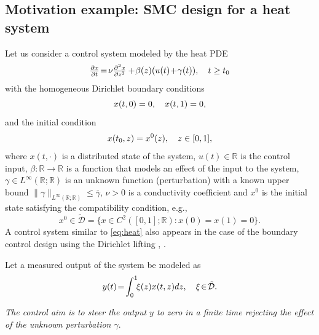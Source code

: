 \documentclass{article}
\newcommand{\R}{\mathbb{R}}
\begin{document}
\subsection{Motivation example: SMC design for a heat system}\label{sec:I.B}
Let us consider a control system modeled by the heat PDE\vspace{-1mm}
\begin{equation}\label{eq:heat}
	\tfrac{\partial x}{\partial t}\!=\!\nu \tfrac{\partial^2x}{\partial z^2}+
	\!\beta(z)(u(t)\!+\!\gamma(t)), \quad t\geq t_0\vspace{-1mm}
\end{equation}
with the homogeneous Dirichlet boundary conditions\vspace{-1mm}
\begin{equation}\label{eq:heat_boundary}
	x(t,0)=0, \quad x(t,1)=0, \vspace{-1mm}
\end{equation}
and the initial condition\vspace{-1mm}
\begin{equation}\label{eq:heat_ic}
	x(t_0,z)=x^0(z), \quad z\in [0,1],\vspace{-1mm}
\end{equation}
where $x(t,\cdot)$ is a distributed state of the system, $u(t)\in\R$ is the  control input,
$\beta: \R\to \R$  is a function that models an effect of the input to the system,  $\gamma\in L^{\infty}(\R;\R)$ is an unknown function (perturbation) with a known upper bound $\|\gamma\|_{L^{\infty}(\R;\R)}\leq \overline{\gamma}$, $\nu>0$ is a conductivity coefficient and $x^0$  is the initial state 
satisfying  the compatibility condition, e.g.,
\begin{equation}\label{eq:tilde_D}
 x^0\in \tilde{ \mathcal{D}}=\{x \in C^{2}([0,1];\R): x(0)=x(1)=0\}.
\end{equation}
A control system similar to  \eqref{eq:heat} also appears in the case of the  boundary control design using the Dirichlet lifting \cite{PrieurTrelat2019:TAC}, \cite{KatzFridman2021:EJC}.
 
Let a measured output of the  system be modeled as\vspace{-1mm}
\begin{equation}\label{eq:heat_y}
	y(t)\!=\!\int^1_0 \!\!\xi(z)x(t,z) dz, \quad \xi \!\in\! \tilde {\mathcal{D}}.\vspace{-1mm}
\end{equation}

\textit{The control aim is to steer the output  $y$ to zero in a finite time rejecting the effect of the unknown perturbation $\gamma$}. 
\end{document}
